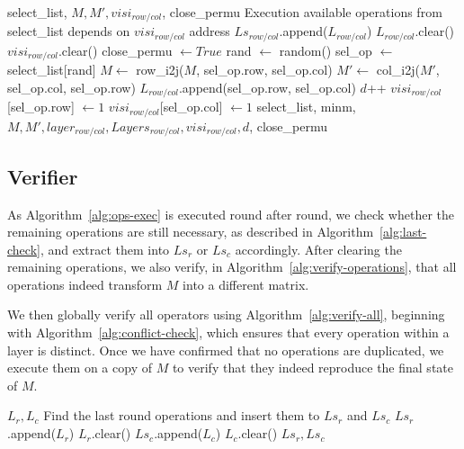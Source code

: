 \begin{algorithm}[htbp]
\caption{Ops\_Exec}
\label{alg:ops-exec}
\begin{algorithmic}[1]
\Require select\_list, $M, M', visi_{row/col}$, close\_permu
\Ensure Execution available operations from select\_list depends on $visi_{row/col}$ address
		\State $Ls_{row/col}$.append($L_{row/col}$)
		\State $L_{row/col}$.clear()
		\State $visi_{row/col}$.clear()
	\EndIf
		\State close\_permu $\leftarrow True$
	\EndIf
\Else
	\State rand $\leftarrow$ random()
	\State sel\_op $\leftarrow$ select\_list[rand]
	\State $M \leftarrow$ row\_i2j($M$, sel\_op.row, sel\_op.col)
	\State $M' \leftarrow$ col\_i2j($M'$, sel\_op.col, sel\_op.row)
	\State $L_{row/col}$.append(sel\_op.row, sel\_op.col)
		\State $d$++
	\EndIf
	\State $visi_{row/col}$[sel\_op.row] $\leftarrow 1$
	\State $visi_{row/col}$[sel\_op.col] $\leftarrow 1$
\EndIf
\State \Return select\_list, minm, $M, M', layer_{row/col}, Layers_{row/col}, visi_{row/col}, d$, close\_permu
\end{algorithmic}
\end{algorithm}

\subsection{Verifier}

As Algorithm~\ref{alg:ops-exec} is executed round after round, we check whether the remaining operations are still necessary, as described in Algorithm~\ref{alg:last-check}, and extract them into $Ls_r$ or $Ls_c$ accordingly. After clearing the remaining operations, we also verify, in Algorithm~\ref{alg:verify-operations}, that all operations indeed transform $M$ into a different matrix.

We then globally verify all operators using Algorithm~\ref{alg:verify-all}, beginning with Algorithm~\ref{alg:conflict-check}, which ensures that every operation within a layer is distinct. Once we have confirmed that no operations are duplicated, we execute them on a copy of $M$ to verify that they indeed reproduce the final state of $M$.

\begin{algorithm}[htbp]
\caption{Last\_Check}
\label{alg:last-check}
\begin{algorithmic}[1]
\Require $L_{r}, L_{c}$
\Ensure Find the last round operations and insert them to $Ls_{r}$ and $Ls_{c}$
	\State $Ls_{r}$.append($L_{r}$)
	\State $L_{r}$.clear()
\EndIf
{}
	\State $Ls_{c}$.append($L_{c}$)
	\State $L_{c}$.clear()
\EndIf
\State \Return $Ls_{r}, Ls_{c}$
\end{algorithmic}
\end{algorithm}

